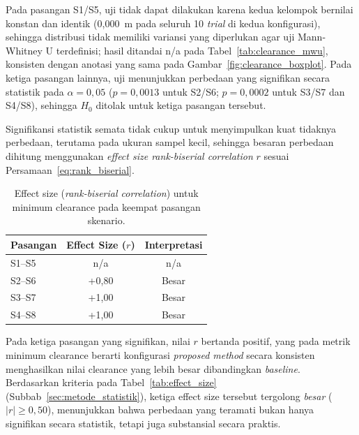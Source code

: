 Pada pasangan S1/S5, uji tidak dapat dilakukan karena kedua kelompok
bernilai konstan dan identik (0,000~m pada seluruh 10 \textit{trial} di
kedua konfigurasi), sehingga distribusi tidak memiliki variansi yang
diperlukan agar uji Mann-Whitney U terdefinisi; hasil ditandai n/a pada
Tabel~\ref{tab:clearance_mwu}, konsisten dengan anotasi yang sama pada
Gambar~\ref{fig:clearance_boxplot}. Pada ketiga pasangan lainnya, uji
menunjukkan perbedaan yang signifikan secara statistik pada $\alpha=0,05$
($p=0,0013$ untuk S2/S6; $p=0,0002$ untuk S3/S7 dan S4/S8), sehingga $H_0$
ditolak untuk ketiga pasangan tersebut.

Signifikansi statistik semata tidak cukup untuk menyimpulkan kuat tidaknya
perbedaan, terutama pada ukuran sampel kecil, sehingga besaran perbedaan
dihitung menggunakan \textit{effect size rank-biserial correlation} $r$
sesuai Persamaan~\ref{eq:rank_biserial}.

\begin{table}[H]
\centering
\caption{Effect size (\textit{rank-biserial correlation}) untuk minimum
clearance pada keempat pasangan skenario.}
\label{tab:clearance_effect_size}
\begin{tabular}{lcc}
\toprule
\textbf{Pasangan} & \textbf{Effect Size ($r$)} & \textbf{Interpretasi} \\
\midrule
S1--S5 & n/a & n/a \\
S2--S6 & +0,80 & Besar \\
S3--S7 & +1,00 & Besar \\
S4--S8 & +1,00 & Besar \\
\bottomrule
\end{tabular}
\end{table}

Pada ketiga pasangan yang signifikan, nilai $r$ bertanda positif, yang pada
metrik minimum clearance berarti konfigurasi \textit{proposed method}
secara konsisten menghasilkan nilai clearance yang lebih besar dibandingkan
\textit{baseline}. Berdasarkan kriteria pada Tabel~\ref{tab:effect_size}
(Subbab~\ref{sec:metode_statistik}), ketiga effect size tersebut tergolong
\textit{besar} ($|r| \geq 0,50$), menunjukkan bahwa perbedaan yang teramati
bukan hanya signifikan secara statistik, tetapi juga substansial secara
praktis.

